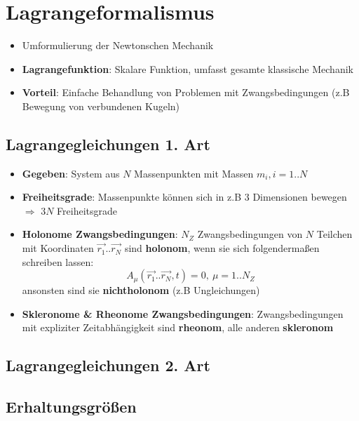 \section{Lagrangeformalismus}%
\label{lag:sec:lagrangeformalismus}

\begin{itemize}
	\item Umformulierung der Newtonschen Mechanik
	\item \textbf{Lagrangefunktion}: Skalare Funktion, umfasst gesamte klassische Mechanik
	\item \textbf{Vorteil}: Einfache Behandlung von Problemen mit Zwangsbedingungen (z.B Bewegung von verbundenen Kugeln)
\end{itemize}

\subsection{Lagrangegleichungen 1. Art}%
\label{lag:sub:lagrangegleichungen_1_art}

\begin{itemize}
	\item \textbf{Gegeben}: System aus $N$ Massenpunkten mit Massen $m_i, i = 1..N$
	\item \textbf{Freiheitsgrade}: Massenpunkte können sich in z.B $3$ Dimensionen bewegen $\Rightarrow$ $3N$ Freiheitsgrade
	\item \textbf{Holonome Zwangsbedingungen}: $N_Z$ Zwangsbedingungen von $N$ Teilchen mit Koordinaten $\vec{r_1}..\vec{r_N}$ sind \textbf{holonom}, wenn sie sich folgendermaßen schreiben lassen: $$A_\mu(\vec{r_1}..\vec{r_N}, t) = 0,\ \mu = 1..N_Z$$ ansonsten sind sie \textbf{nichtholonom} (z.B Ungleichungen)
	\item \textbf{Skleronome \& Rheonome Zwangsbedingungen}: Zwangsbedingungen mit expliziter Zeitabhängigkeit sind \textbf{rheonom}, alle anderen \textbf{skleronom}
\end{itemize}

\subsection{Lagrangegleichungen 2. Art}%
\label{lag:sub:lagrangegleichungen_2_art}

\subsection{Erhaltungsgrößen}%
\label{lag:sub:erhaltungsgroessen}
